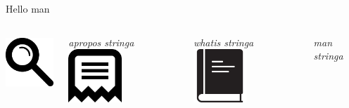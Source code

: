 \documentclass{beamer}
\begin{document}
    \begin{frame}{Hello man}
        \begin{columns}[t, onlytextwidth]
                \centering
                \includegraphics[height=2cm]{images/search.pdf}

                \vspace{0.2cm}

                \textit{apropos stringa}
                \centering
                \includegraphics[height=2cm]{images/whatis.pdf}

                \vspace{0.2cm}

                \textit{whatis stringa}
                \centering
                \includegraphics[height=2cm]{images/man.pdf}

                \vspace{0.2cm}

                \textit{man stringa}
        \end{columns}
    \end{frame}
\end{document}
